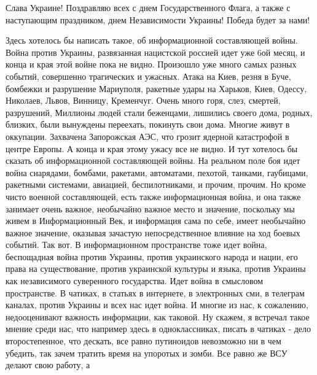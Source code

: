  
 
 
 
 

Слава Украине! Поздравляю всех с днем Государственного Флага, а также с
наступающим праздником, днем Независимости Украины! Победа будет за нами!

Здесь хотелось бы написать такое, об информационной составляющей войны. Война
против Украины, развязанная нацистской россией идет уже 6ой месяц, и конца и
края этой войне пока не видно. Произошло уже много самых разных событий,
совершенно трагических и ужасных. Атака на Киев, резня в Буче, бомбежки и
разрушение Мариуполя, ракетные удары на Харьков, Киев, Одессу, Николаев, Львов,
Винницу, Кременчуг. Очень много горя, слез, смертей, разрушений, Миллионы людей
стали беженцами, лишились своего дома, родных, близких, были вынуждены
переехать, покинуть свои дома. Многие живут в оккупации. Захвачена Запорожская
АЭС, что грозит ядерной катастрофой в центре Европы. А конца и края этому ужасу
все не видно. И тут хотелось бы сказать об информационной составляющей войны.
На реальном поле боя идет война снарядами, бомбами, ракетами, автоматами,
пехотой, танками, гаубицами, ракетными системами, авиацией, беспилотниками, и
прочим, прочим. Но кроме чисто военной составляющей, есть также информационная
война, и она также занимает очень важное, необычайно важное место и значение,
поскольку мы живем в Информационный Век, и информация сама по себе, имеет
необычайно важное значение, оказывая зачастую непосредственное влияние на ход
боевых событий. Так вот. В информационном пространстве тоже идет война,
беспощадная война против Украины, против украинского народа и нации, его права
на существование, против украинской культуры и языка, против Украины как
независимого суверенного государства. Идет война в смысловом пространстве. В
чатиках, в статьях в интернете, в электронных сми, в телеграм каналах,  против
Украины и всех нас идет война. И многие из нас, к сожалению, недооценивают
важность информации, как таковой. Ну скажем, я встречал такое мнение среди нас,
что например здесь в одноклассниках, писать в чатиках - дело второстепенное,
что дескать, все равно путиноидов невозможно ни в чем убедить, так зачем
тратить время на упоротых и зомби. Все равно же ВСУ делают свою работу, а
